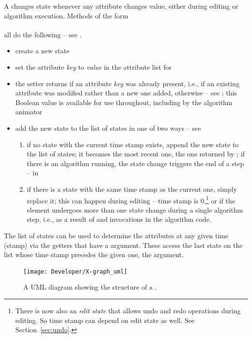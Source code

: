 A  changes state whenever any attribute changes value,
either during editing or algorithm execution. Methods of the form\\
\\
all do the following -- see .
\begin{itemize}
\item create a new state 
\item set the attribute \emph{key} to \emph{value} in the attribute list for
\item the setter returns  if an attribute \emph{key} was already
  present, i.e., if an existing attribute was modified rather than a new one
  added,  otherwise -- see ; this Boolean
  value is available for use throughout, including by the algorithm animator
\item add the new state to the list of states in one of two ways -- see
  \begin{enumerate}
    \item if no state with the current time stamp exists, append the new
      state to the list of states; it becomes the most recent one, the one
      returned by ; if there is an algorithm running, the
      state change triggers the end of a step --
       in 
    \item if there is a state with the same time stamp as the current one,
      simply replace it; this can happen during editing -- time stamp is
      0,\footnote{There is now also an \emph{edit state} that allows undo and
        redo operations during editing. So time stamp can depend on edit
        state as well. See Section~\ref{sec:undo}.
        }
      or if the element undergoes more than one state change during a single
      algorithm step, i.e., as a result of  and
       invocations in the algorithm code.
  \end{enumerate}
\end{itemize}
The list of states can be used to determine the attributes at any given time
(stamp) via the getters that have a  argument. These access the
last state on the list whose time stamp precedes the given one, the
 argument.

\begin{figure}
  \begin{center}
    \texttt{[image: Developer/X-graph\_uml]}
  \end{center}
  \caption{A UML diagram showing the structure of a .}
  \label{fig:graph_uml}
\end{figure}

